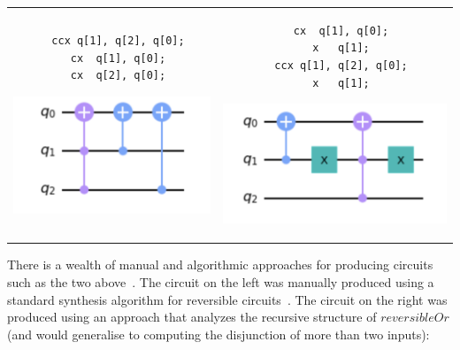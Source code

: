 \medskip
\begin{tabular}{c@{\qquad}c}
\begin{minipage}[t]{0.42\linewidth}
  \begin{verbatim}
  ccx q[1], q[2], q[0];
  cx  q[1], q[0];
  cx  q[2], q[0];
  \end{verbatim}
  \includegraphics[scale=0.7]{reversibleOr.png}
  \end{minipage}
&
\begin{minipage}[t]{0.43\linewidth}
  \begin{verbatim}
  cx  q[1], q[0];
  x   q[1];
  ccx q[1], q[2], q[0];
  x   q[1];
  \end{verbatim}
  \includegraphics[scale=0.6]{reversibleOr2.png}
  \end{minipage}
\end{tabular}

\medskip

There is a wealth of manual and algorithmic approaches for producing circuits
such as the two above~\cite{maslov:2003:rls:1087512,1201583}. The circuit on the
left was manually produced using a standard synthesis algorithm for reversible
circuits~\cite{10.1145/775832.775915}. The circuit on the right was produced
using an approach that analyzes the recursive structure of
$\mathit{reversibleOr}$ (and would generalise to computing the disjunction of
more than two inputs):

